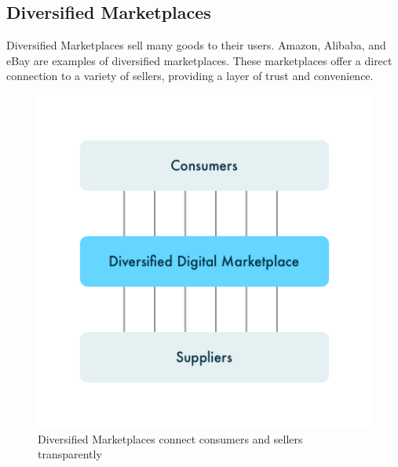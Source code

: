 \subsection{Diversified Marketplaces}
Diversified Marketplaces sell many goods to their users. Amazon, Alibaba, and eBay are examples of diversified marketplaces. These marketplaces offer a direct connection to a variety of sellers, providing a layer of trust and convenience.
\begin{figure}[ht!]
\begin{center}
\includegraphics[scale=0.5]{figures/diversified.png}
\end{center}
\caption[Diversified Marketplaces]{Diversified Marketplaces connect consumers and sellers transparently}
\label{diversified_marketplace}
\end{figure}


